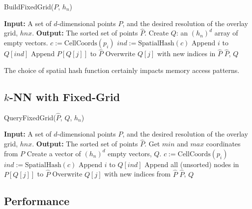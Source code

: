 \documentclass{report}
\begin{document}
\begin{algorithm} 
\caption{BuildFixedGrid($P$, $h_n$)}         
\label{alg:fixed_grid}  
\begin{algorithmic}[1]    
    \State \textbf{Input:} A set of $d$-dimensional points $P$, and the desired resolution of the overlay grid, $hnx$.
    \State \textbf{Output:} The sorted set of points $\hat{P}$.
    \State
    \State Create $Q$: an $(h_n)^d$ array of empty vectors. 
       \State $c := \text{CellCoords}(p_i)$ 
       \State $ind := \text{SpatialHash}(c)$
       \State Append $i$ to $Q[ind]$
    \EndFor
        \State Append $P[Q[j]]$ to $\hat{P}$
        \State Overwrite $Q[j]$ with new indices in $\hat{P}$ 
    \EndIf
    \EndFor
    \State \Return $\hat{P}$, $Q$
    \end{algorithmic}
\end{algorithm}

The choice of spatial hash function certainly impacts memory access patterns. 




\subsection{$k$-NN with Fixed-Grid}

\begin{algorithm} 
\caption{QueryFixedGrid($\hat{P}$, $Q$, $h_n$)}         
\label{alg:fixed_grid}  
\begin{algorithmic}[1]    
    \State \textbf{Input:} A set of $d$-dimensional points $P$, and the desired resolution of the overlay grid, $hnx$.
    \State \textbf{Output:} The sorted set of points $\hat{P}$.
    \State Get $min$ and $max$ coordinates from $P$
    \State Create a vector of $(h_n)^d$ empty vectors, $Q$. 
       \State $c := \text{CellCoords}(p_i)$ 
       \State $ind := \text{SpatialHash}(c)$
       \State Append $i$ to $Q[ind]$
    \EndFor
        \State Append all (unsorted) nodes in $P[Q[j]]$ to $\hat{P}$
        \State Overwrite $Q[j]$ with new indices from $\hat{P}$ 
    \EndIf
    \EndFor
    \State \Return $\hat{P}$, $Q$
    \end{algorithmic}
\end{algorithm}



\subsection{Performance} 
\end{document}
